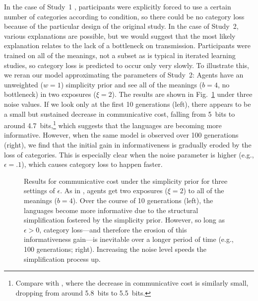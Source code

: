 \documentclass[doc,biblatex]{apa7}
\begin{document}
In the case of Study~1 \parencite[i.e.,][]{Xu:2013}, participants were explicitly forced to use a certain number of categories according to condition, so there could be no category loss because of the particular design of the original study. In the case of Study~2, various explanations are possible, but we would suggest that the most likely explanation relates to the lack of a bottleneck on transmission. Participants were trained on all of the meanings, not a subset as is typical in iterated learning studies, so category loss is predicted to occur only very slowly. To illustrate this, we reran our model approximating the parameters of Study~2: Agents have an unweighted ($w=1$) simplicity prior and see all of the meanings ($b=4$, no bottleneck) in two exposures ($\xi=2$). The results are shown in Fig.~\ref{fig16} under three noise values. If we look only at the first 10 generations (left), there appears to be a small but sustained decrease in communicative cost, falling from 5~bits to around 4.7~bits,\footnote{Compare with \textcite[][Fig.~5]{Carstensen:2015}, where the decrease in communicative cost is similarly small, dropping from around 5.8~bits to 5.5~bits.} which suggests that the languages are becoming more informative. However, when the same model is observed over 100 generations (right), we find that the initial gain in informativeness is gradually eroded by the loss of categories. This is especially clear when the noise parameter is higher (e.g., $\epsilon=.1$), which causes category loss to happen faster.

	\begin{figure}
	\vspace*{2pt}
	\caption{Results for communicative cost under the simplicity prior for three settings of $\epsilon$. As in \textcite[][Study~2]{Carstensen:2015}, agents get two exposures ($\xi=2$) to all of the meanings ($b=4$). Over the course of 10 generations (left), the languages become more informative due to the structural simplification fostered by the simplicity prior. However, so long as $\epsilon > 0$, category loss---and therefore the erosion of this informativeness gain---is inevitable over a longer period of time (e.g., 100 generations; right). Increasing the noise level speeds the simplification process up.}
	\label{fig16}
	\end{figure}
\end{document}
